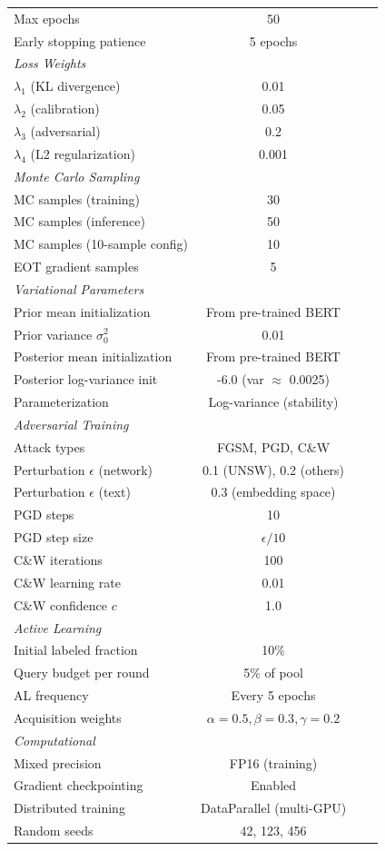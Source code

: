 \documentclass[12pt,a4paper]{article}
\theoremstyle{definition}
\begin{document}
\begin{longtable}{lccc}
Max epochs & 50 \\
Early stopping patience & 5 epochs \\
\midrule
\multicolumn{2}{l}{\textit{Loss Weights}} \\
$\lambda_1$ (KL divergence) & 0.01 \\
$\lambda_2$ (calibration) & 0.05 \\
$\lambda_3$ (adversarial) & 0.2 \\
$\lambda_4$ (L2 regularization) & 0.001 \\
\midrule
\multicolumn{2}{l}{\textit{Monte Carlo Sampling}} \\
MC samples (training) & 30 \\
MC samples (inference) & 50 \\
MC samples (10-sample config) & 10 \\
EOT gradient samples & 5 \\
\midrule
\multicolumn{2}{l}{\textit{Variational Parameters}} \\
Prior mean initialization & From pre-trained BERT \\
Prior variance $\sigma_0^2$ & 0.01 \\
Posterior mean initialization & From pre-trained BERT \\
Posterior log-variance init & -6.0 (var $\approx$ 0.0025) \\
Parameterization & Log-variance (stability) \\
\midrule
\multicolumn{2}{l}{\textit{Adversarial Training}} \\
Attack types & FGSM, PGD, C\&W \\
Perturbation $\epsilon$ (network) & 0.1 (UNSW), 0.2 (others) \\
Perturbation $\epsilon$ (text) & 0.3 (embedding space) \\
PGD steps & 10 \\
PGD step size & $\epsilon / 10$ \\
C\&W iterations & 100 \\
C\&W learning rate & 0.01 \\
C\&W confidence $c$ & 1.0 \\
\midrule
\multicolumn{2}{l}{\textit{Active Learning}} \\
Initial labeled fraction & 10\% \\
Query budget per round & 5\% of pool \\
AL frequency & Every 5 epochs \\
Acquisition weights & $\alpha=0.5, \beta=0.3, \gamma=0.2$ \\
\midrule
\multicolumn{2}{l}{\textit{Computational}} \\
Mixed precision & FP16 (training) \\
Gradient checkpointing & Enabled \\
Distributed training & DataParallel (multi-GPU) \\
Random seeds & 42, 123, 456 \\
\bottomrule
\end{longtable}
\end{document}

